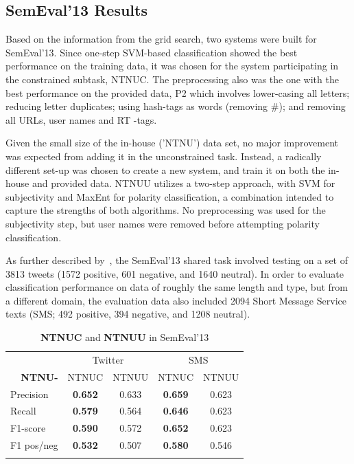 \subsection{SemEval'13 Results}

Based on the information from the grid search, two systems were built for SemEval'13. Since one-step SVM-based classification showed the best performance on the training data, it was chosen for the system participating in the constrained subtask, NTNUC. The preprocessing also was the one with the best performance on the provided data, P2 which involves lower-casing all letters; reducing letter duplicates; using hash-tags as words (removing \#); and removing all URLs, user names and RT -tags.

Given the small size of the in-house ('NTNU') data set, no major improvement was expected from adding it in the unconstrained task. Instead, a radically different set-up was chosen to create a new system, and train it on both the in-house and provided data. NTNUU utilizes a two-step approach, with SVM for subjectivity and MaxEnt for polarity classification, a combination intended to capture the strengths of both algorithms. No preprocessing was used for the subjectivity step, but user names were removed before attempting polarity classification.

As further described by~\citet{WilsonEA:13}, the SemEval'13 shared task involved testing on a set of 3813 tweets (1572 positive, 601 negative, and 1640 neutral). In order to evaluate classification performance on data of roughly the same length and type, but from a different domain, the evaluation data also included 2094 Short Message Service texts (SMS; 492 positive, 394 negative, and 1208 neutral).

\begin{table}

\centering
\begin{tabular}{l|cc|cc} 
\noalign{\smallskip}\hline\noalign{\smallskip}
	& \multicolumn{2}{c|}{Twitter}	& \multicolumn{2}{c}{SMS} \\
 \multicolumn{1}{r|}{\bf NTNU-}	&  {\footnotesize NTNUC}	& {\footnotesize NTNUU}	& {\footnotesize NTNUC}	& {\footnotesize NTNUU} \\
\noalign{\smallskip}\hline\noalign{\smallskip}
Precision    				& {\bf 0.652}	& 0.633 	& {\bf 0.659} 	& 0.623 \\
Recall       				& {\bf 0.579}  	& 0.564 	& {\bf 0.646} 	& 0.623  \\
F1-score  				& {\bf 0.590}  	& 0.572 	& {\bf 0.652} 	& 0.623  \\
F1 pos/neg 				& {\bf 0.532}  	& 0.507 	& {\bf 0.580} 	& 0.546  \\
\noalign{\smallskip}\hline\noalign{\smallskip}
\end{tabular}

\caption{{\bf NTNUC} and {\bf NTNUU} in SemEval'13}
\label{tab:semeval_results}
\end{table}

